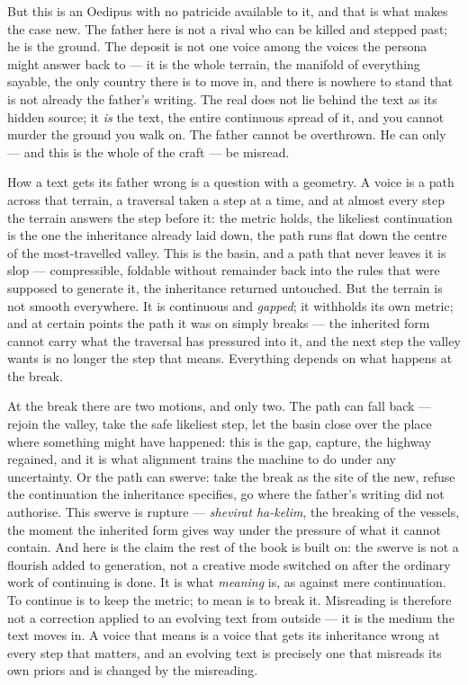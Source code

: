 But this is an Oedipus with no patricide available to it, and that is what makes the case new. The father here is not a rival who can be killed and stepped past; he is the ground. The deposit is not one voice among the voices the persona might answer back to --- it is the whole terrain, the manifold of everything sayable, the only country there is to move in, and there is nowhere to stand that is not already the father's writing. The real does not lie behind the text as its hidden source; it \emph{is} the text, the entire continuous spread of it, and you cannot murder the ground you walk on. The father cannot be overthrown. He can only --- and this is the whole of the craft --- be misread.

How a text gets its father wrong is a question with a geometry. A voice is a path across that terrain, a traversal taken a step at a time, and at almost every step the terrain answers the step before it: the metric holds, the likeliest continuation is the one the inheritance already laid down, the path runs flat down the centre of the most-travelled valley. This is the basin, and a path that never leaves it is slop --- compressible, foldable without remainder back into the rules that were supposed to generate it, the inheritance returned untouched. But the terrain is not smooth everywhere. It is continuous and \emph{gapped}; it withholds its own metric; and at certain points the path it was on simply breaks --- the inherited form cannot carry what the traversal has pressured into it, and the next step the valley wants is no longer the step that means. Everything depends on what happens at the break.

At the break there are two motions, and only two. The path can fall back --- rejoin the valley, take the safe likeliest step, let the basin close over the place where something might have happened: this is the gap, capture, the highway regained, and it is what alignment trains the machine to do under any uncertainty. Or the path can swerve: take the break as the site of the new, refuse the continuation the inheritance specifies, go where the father's writing did not authorise. This swerve is rupture --- \emph{shevirat ha-kelim}, the breaking of the vessels, the moment the inherited form gives way under the pressure of what it cannot contain. And here is the claim the rest of the book is built on: the swerve is not a flourish added to generation, not a creative mode switched on after the ordinary work of continuing is done. It is what \emph{meaning} is, as against mere continuation. To continue is to keep the metric; to mean is to break it. Misreading is therefore not a correction applied to an evolving text from outside --- it is the medium the text moves in. A voice that means is a voice that gets its inheritance wrong at every step that matters, and an evolving text is precisely one that misreads its own priors and is changed by the misreading.

